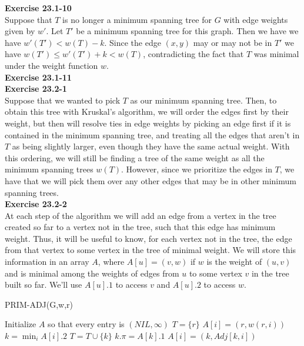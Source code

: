 \documentclass{article}
\begin{document}
\noindent\textbf{Exercise 23.1-10}\\

Suppose that $T$ is no longer a minimum spanning tree for $G$ with edge weights given by $w'$.  Let $T'$ be a minimum spanning tree for this graph.  Then we have we have $w'(T') < w(T) - k$.  Since the edge $(x,y)$ may or may not be in $T'$ we have $w(T') \leq w'(T') + k < w(T)$, contradicting the fact that $T$ was minimal under the weight function $w$. \\

\noindent\textbf{Exercise 23.1-11}\\


\noindent\textbf{Exercise 23.2-1}\\

Suppose that we wanted to pick $T$ as our minimum spanning tree. Then, to obtain this tree with Kruskal's algorithm, we will order the edges first by their weight, but then will resolve ties in edge weights by picking an edge first if it is contained in the minimum spanning tree, and treating all the edges that aren't in $T$ as being slightly larger, even though they have the same actual weight. With this ordering, we will still be finding a tree of the same weight as all the minimum spanning trees $w(T)$. However, since we prioritize the edges in $T$, we have that we will pick them over any other edges that may be in other minimum spanning trees.\\

\noindent\textbf{Exercise 23.2-2}\\

At each step of the algorithm we will add an edge from a vertex in the tree created so far to a vertex not in the tree, such that this edge has minimum weight.  Thus, it will be useful to know, for each vertex not in the tree, the edge from that vertex to some vertex in the tree of minimal weight.  We will store this information in an array $A$, where $A[u] = (v, w)$ if $w$ is the weight of $(u,v)$ and is minimal among the weights of edges from $u$ to some vertex $v$ in the tree built so far.  We'll use $A[u].1$ to access $v$ and $A[u].2$ to access $w$.\\

\begin{algorithm}
\caption{PRIM-ADJ(G,w,r)}
\begin{algorithmic}
\State Initialize $A$ so that every entry is $(NIL,\infty)$
\State $T = \{r\}$
		\State $A[i] = (r, w(r,i))$
	\EndIf
\EndFor
{}
	\State $k = \min_{i} A[i].2$
	\State $T = T \cup \{k\}$
	\State $k.\pi = A[k].1$
			\State $A[i] = (k, Adj[k,i])$
		\EndIf
	\EndFor
\EndFor
\end{algorithmic}
\end{algorithm}
\end{document}
